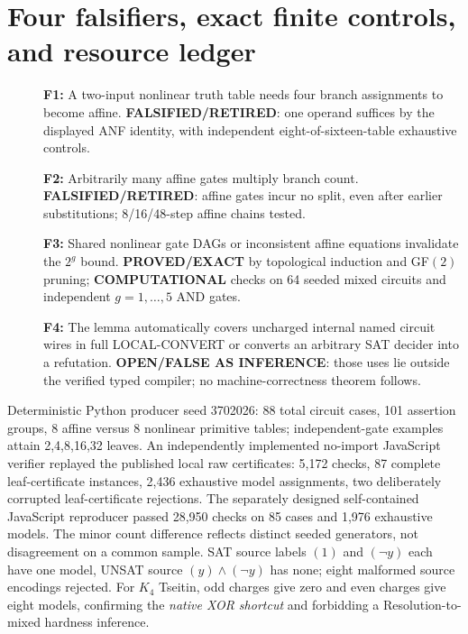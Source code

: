 \documentclass[11pt]{article}
\begin{document}
\section*{Four falsifiers, exact finite controls, and resource ledger}
\begin{description}
\item[] \textbf{F1:} A two-input nonlinear truth table needs four branch assignments to become affine. \textbf{FALSIFIED/RETIRED}: one operand suffices by the displayed ANF identity, with independent eight-of-sixteen-table exhaustive controls.
\item[] \textbf{F2:} Arbitrarily many affine gates multiply branch count. \textbf{FALSIFIED/RETIRED}: affine gates incur no split, even after earlier substitutions; 8/16/48-step affine chains tested.
\item[] \textbf{F3:} Shared nonlinear gate DAGs or inconsistent affine equations invalidate the $2^g$ bound. \textbf{PROVED/EXACT} by topological induction and GF$(2)$ pruning; \textbf{COMPUTATIONAL} checks on 64 seeded mixed circuits and independent $g=1,\ldots,5$ AND gates.
\item[] \textbf{F4:} The lemma automatically covers uncharged internal named circuit wires in full LOCAL-CONVERT or converts an arbitrary SAT decider into a refutation. \textbf{OPEN/FALSE AS INFERENCE}: those uses lie outside the verified typed compiler; no machine-correctness theorem follows.
\end{description}
Deterministic Python producer seed 3702026: 88 total circuit cases, 101 assertion groups, 8 affine versus 8 nonlinear primitive tables; independent-gate examples attain 2,4,8,16,32 leaves. An independently implemented no-import JavaScript verifier replayed the published local raw certificates: 5,172 checks, 87 complete leaf-certificate instances, 2,436 exhaustive model assignments, two deliberately corrupted leaf-certificate rejections. The separately designed self-contained JavaScript reproducer passed 28,950 checks on 85 cases and 1,976 exhaustive models. The minor count difference reflects distinct seeded generators, not disagreement on a common sample. SAT source labels $(1)$ and $(\neg y)$ each have one model, UNSAT source $(y)\land(\neg y)$ has none; eight malformed source encodings rejected. For $K_4$ Tseitin, odd charges give zero and even charges give eight models, confirming the \emph{native XOR shortcut} and forbidding a Resolution-to-mixed hardness inference.
\end{document}
